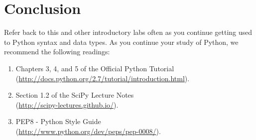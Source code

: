 \section*{Conclusion}
Refer back to this and other introductory labs often as you continue getting used to Python syntax and data types.
As you continue your study of Python, we recommend the following readings:
\begin{enumerate}
\item Chapters 3, 4, and 5 of the Official Python Tutorial \\
        (\url{http://docs.python.org/2.7/tutorial/introduction.html}).
\item Section 1.2 of the SciPy Lecture Notes\\
        (\url{http://scipy-lectures.github.io/}).
\item PEP8 - Python Style Guide \\
        (\url{http://www.python.org/dev/peps/pep-0008/}).
\end{enumerate}
